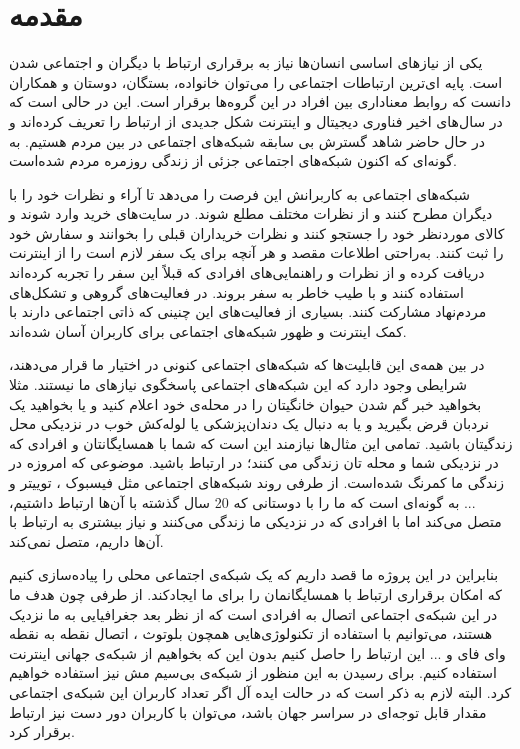 
\chapter{مقدمه}
\thispagestyle{empty}
یکی از نیازهای اساسی انسان‌ها نیاز به برقراری ارتباط با دیگران و اجتماعی شدن است. پایه ای‌ترین ارتباطات اجتماعی را می‌توان خانواده، بستگان، دوستان و همکاران دانست که روابط معناداری بین افراد در این گروه‌ها برقرار است. این در حالی است که در سال‌های اخیر فناوری دیجیتال و اینترنت شکل جدیدی از ارتباط را تعریف کرده‌اند و در حال حاضر شاهد گسترش بی سابقه شبکه‌های اجتماعی
 در بین مردم هستیم. به گونه‌ای که اکنون شبکه‌های اجتماعی جزئی از زندگی روزمره مردم شده‌است. 
 
 شبکه‌های اجتماعی به کاربرانش این فرصت را می‌دهد تا آراء و نظرات خود را با دیگران مطرح کنند و از نظرات مختلف مطلع شوند. در سایت‌های خرید وارد شوند و کالای موردنظر خود را جستجو کنند و نظرات خریداران قبلی را بخوانند و سفارش خود را ثبت کنند. به‌راحتی اطلاعات مقصد و هر آنچه برای یک سفر لازم است را از اینترنت دریافت کرده و از نظرات و راهنمایی‌های افرادی که قبلاً این سفر را تجربه کرده‌اند استفاده کنند و با طیب خاطر به سفر بروند. در فعالیت‌های گروهی و تشکل‌های مردم‌نهاد مشارکت کنند. بسیاری از فعالیت‌های این چنینی که ذاتی اجتماعی دارند با کمک اینترنت و ظهور شبکه‌های اجتماعی برای کاربران آسان شده‌اند.
 
در بین همه‌ی این قابلیت‌ها که شبکه‌های اجتماعی کنونی در اختیار ما قرار می‌دهند، شرایطی وجود دارد که این شبکه‌های اجتماعی پاسخگوی نیاز‌های ما نیستند. مثلا بخواهید خبر گم شدن حیوان خانگیتان را در محله‌ی خود اعلام کنید و یا بخواهید یک نردبان قرض بگیرید و یا به دنبال یک دندان‌پزشکی یا لوله‌کش خوب در نزدیکی محل زندگیتان باشید. تمامی این مثال‌ها نیازمند این است که شما با همسایگانتان و افرادی که در نزدیکی شما و محله تان زندگی می کنند؛ در ارتباط باشید. موضوعی که امروزه در زندگی ما کمرنگ شده‌است. از طرفی روند شبکه‌های اجتماعی مثل فیسبوک
، توییتر 
و ... به گونه‌ای است که ما را با دوستانی که 20 سال گذشته با آن‌ها ارتباط داشتیم، متصل می‌کند اما با افرادی که در نزدیکی ما زندگی می‌کنند و نیاز بیشتری به ارتباط با آن‌ها داریم، متصل نمی‌کند.

بنابراین در این پروژه ما قصد داریم که یک شبکه‌ی اجتماعی محلی را پیاده‌سازی کنیم که امکان برقراری ارتباط با همسایگانمان را برای ما ایجاد‌کند. از طرفی چون هدف ما در این شبکه‌ی اجتماعی اتصال به افرادی است که از نظر بعد جغرافیایی به ما نزدیک هستند، می‌توانیم با استفاده از تکنولوژی‌هایی همچون بلوتوث
، اتصال نقطه به نقطه وای فای 
و ... این ارتباط را حاصل کنیم بدون این که بخواهیم از شبکه‌ی جهانی اینترنت
 استفاده کنیم. برای رسیدن به این منظور از شبکه‌ی بی‌سیم مش 
 نیز استفاده خواهیم کرد. البته لازم به ذکر است که در حالت ایده آل اگر تعداد کاربران این شبکه‌ی اجتماعی مقدار قابل توجه‌ای در سراسر جهان باشد، می‌توان با کاربران دور دست نیز ارتباط برقرار کرد. 


